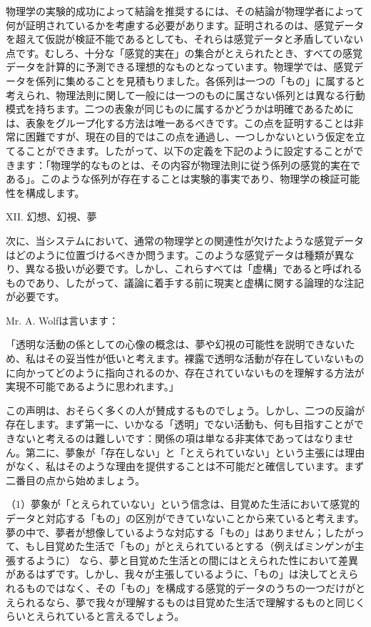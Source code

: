 \documentclass[a4paper,11pt,openany]{ltjsbook}
\begin{document}
物理学の実験的成功によって結論を推奨するには、その結論が物理学者によって何が証明されているかを考慮する必要があります。証明されるのは、感覚データを超えて仮説が検証不能であるとしても、それらは感覚データと矛盾していない点です。むしろ、十分な「感覚的実在」の集合がとえられたとき、すべての感覚データを計算的に予測できる理想的なものとなっています。物理学では、感覚データを係列に集めることを見積もりました。各係列は一つの「もの」に属すると考えられ、物理法則に関して一般には一つのものに属さない係列とは異なる行動模式を持ちます。二つの表象が同じものに属するかどうかは明確であるためには、表象をグループ化する方法は唯一あるべきです。この点を証明することは非常に困難ですが、現在の目的ではこの点を通過し、一つしかないという仮定を立てることができます。したがって、以下の定義を下記のように設定することができます：「物理学的なものとは、その内容が物理法則に従う係列の感覚的実在である」。このような係列が存在することは実験的事実であり、物理学の検証可能性を構成します。

XII. 幻想、幻視、夢

次に、当システムにおいて、通常の物理学との関連性が欠けたような感覚データはどのように位置づけるべきか問うます。このような感覚データは種類が異なり、異なる扱いが必要です。しかし、これらすべては「虚構」であると呼ばれるものであり、したがって、議論に着手する前に現実と虚構に関する論理的な注記が必要です。

Mr. A. Wolfは言います：

「透明な活動の係としての心像の概念は、夢や幻視の可能性を説明できないため、私はその妥当性が低いと考えます。裸露で透明な活動が存在していないものに向かってどのように指向されるのか、存在されていないものを理解する方法が実現不可能であるように思われます。」

この声明は、おそらく多くの人が賛成するものでしょう。しかし、二つの反論が存在します。まず第一に、いかなる「透明」でない活動も、何も目指すことができないと考えるのは難しいです：関係の項は単なる非実体であってはなりません。第二に、夢象が「存在しない」と「とえられていない」という主張には理由がなく、私はそのような理由を提供することは不可能だと確信しています。まず二番目の点から始めましょう。

（1）夢象が「とえられていない」という信念は、目覚めた生活において感覚的データと対応する「もの」の区別ができていないことから来ていると考えます。夢の中で、夢者が想像しているような対応する「もの」はありません；したがって、もし目覚めた生活で「もの」がとえられているとする（例えばミンゲンが主張するように） なら、夢と目覚めた生活との間にはとえられた性において差異があるはずです。しかし、我々が主張しているように、「もの」は決してとえられるものではなく、その「もの」を構成する感覚的データのうちの一つだけがとえられるなら、夢で我々が理解するものは目覚めた生活で理解するものと同じくらいとえられていると言えるでしょう。
\end{document}
